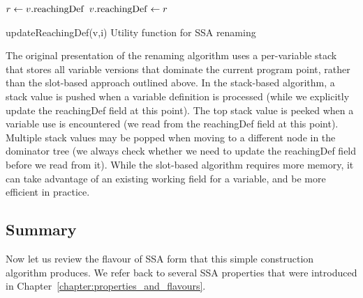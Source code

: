 {\begin{procedure}
  $r \leftarrow v.\mathrm{reachingDef}$\;
  $v.\mathrm{reachingDef} \leftarrow r$\;
\caption{updateReachingDef(v,i) Utility
  function for SSA renaming\label{alg:classical:updateRD}}
\end{procedure}

The original presentation of the renaming algorithm uses a per-variable stack that stores all variable versions that dominate the current program point, rather than the slot-based approach outlined above. 
In the stack-based algorithm, a stack value is pushed when a variable definition is processed (while we explicitly update the reachingDef field at this point). 
The top stack value is peeked when a variable use is encountered (we read from the reachingDef field at this point). 
Multiple stack values may be popped when moving to a different node in the dominator tree (we always check whether we need to update the reachingDef field before we read from it). 
While the slot-based algorithm requires more memory, it can take advantage of an existing working field for a variable, and be more efficient in practice.

\subsection{Summary}
Now let us review the flavour of SSA form that this simple construction algorithm produces. 
We refer back to several SSA properties that were introduced in Chapter~\ref{chapter:properties_and_flavours}.

}
